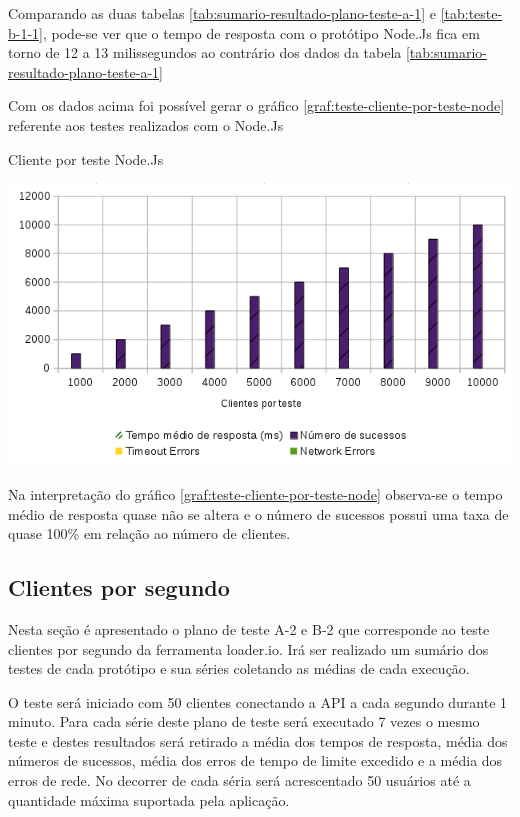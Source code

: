   Comparando as duas tabelas \ref{tab:sumario-resultado-plano-teste-a-1} e \ref{tab:teste-b-1-1}, pode-se ver que 
  o tempo de resposta com o protótipo Node.Js fica em torno de 12 a 13 milissegundos ao contrário dos dados da tabela \ref{tab:sumario-resultado-plano-teste-a-1}
  
  Com os dados acima foi possível gerar o gráfico \ref{graf:teste-cliente-por-teste-node} referente aos testes 
  realizados com o Node.Js

  \begin{grafico}[H]
    \setlength{\abovecaptionskip}{5pt}
    \setlength{\belowcaptionskip}{0pt}
    \label{graf:teste-cliente-por-teste-node}
    \caption[Cliente por teste Node.Js]
	    {Cliente por teste Node.Js}
    \centering
    \includegraphics[width=.80\textwidth]{imagem/graficos/grafico_node_plano_de_teste_1.png}
    \captionsetup[grafico]{justification=centering}
  \end{grafico}
  
  Na interpretação do gráfico \ref{graf:teste-cliente-por-teste-node}  observa-se o tempo médio de resposta quase não se altera
  e o número de sucessos possui uma taxa de quase 100\% em relação ao número de clientes.
  
\subsection{Clientes por segundo}  
  
  Nesta seção é apresentado o plano de teste A-2 e B-2 que corresponde ao teste clientes por segundo da ferramenta loader.io. Irá
  ser realizado um sumário dos testes de cada protótipo e sua séries coletando as médias de cada execução.
  
  O teste será iniciado com 50 clientes conectando a API a cada segundo durante 1 minuto. Para cada série deste plano de teste
  será executado 7 vezes o mesmo teste e destes resultados será retirado a média dos tempos de resposta, média dos números de 
  sucessos, média dos erros de tempo de limite excedido e a média dos erros de rede. No decorrer de cada séria será acrescentado
  50 usuários até a quantidade máxima suportada pela aplicação.
  
